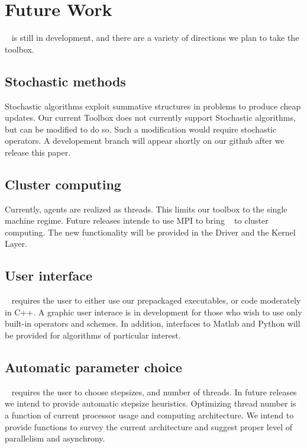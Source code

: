 \section{Future Work}

\pkg~ is still in development, and there are a variety of directions we plan to take the toolbox.

\subsection{Stochastic methods} 

Stochastic algorithms exploit summative structures in problems to produce cheap updates. Our current Toolbox does not currently support Stochastic algorithms, but can be modified to do so. Such a modification would require stochastic operators. A developement branch will appear shortly on our github after we release this paper.  

\subsection{Cluster computing}
 
 Currently, agents are realized as threads.
 This limits our toolbox to the single machine regime.
 Future releases intende to use MPI to bring \pkg~ to cluster computing. The new functionality will be provided in the Driver and the Kernel Layer. 

\subsection{User interface}
 \pkg~ requires the user to either use our prepackaged executables, or code moderately in C++.
 A graphic user interace is in development for those who wish to use only built-in operators and schemes.
 In addition, interfaces to Matlab and Python will be provided for algorithms of particular interest.
 
\subsection{Automatic parameter choice}
\pkg~ requires the user to choose stepsizes, and number of threads.
In future releases we intend to provide automatic stepsize heuristics. 
Optimizing thread number is a function of current processor usage and computing architecture. 
We intend to provide functions to survey the current architecture and suggest proper level of parallelism and asynchrony.

